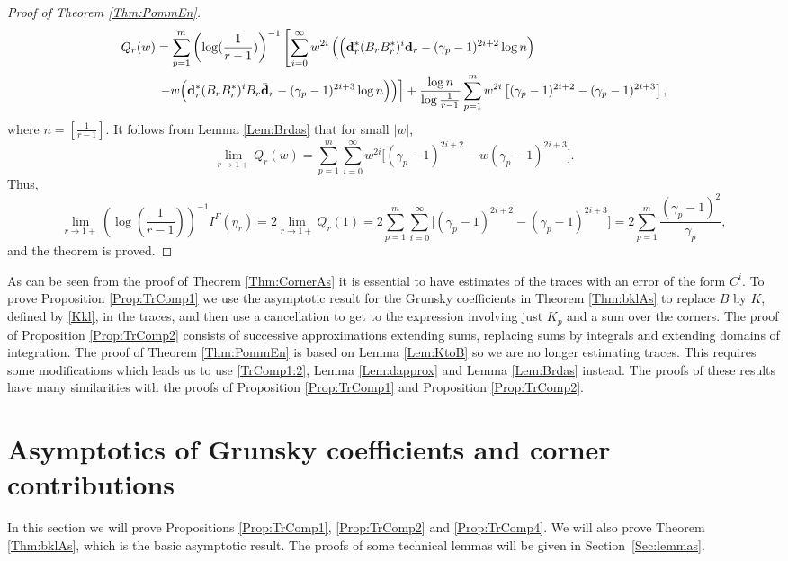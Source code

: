 \documentclass{article}
\numberwithin{equation}{section}
\numberwithin{figure}{section}
\theoremstyle{plain}
\theoremstyle{plain}
\numberwithin{thm}{section}
\theoremstyle{remark}
\begin{document}
\begin{proof}[Proof of Theorem \ref{Thm:PommEn}]
\begin{align*}
    Q_r(w)&=\sum_{p=1}^m\left(\log(\frac 1{r-1})\right)^{-1}\left[\sum_{i=0}^\infty w^{2i}\left(\Big({\bf d}_r^*(B_rB_r^*)^i{\bf d}_r-(\gamma_p-1)^{2i+2}\log n\Big)\right.\right.\\
    &\left.\left.-w\Big({\bf d}_r^*(B_rB_r^*)^iB_r\bar{{\bf d}}_r-(\gamma_p-1)^{2i+3}\log n\Big)\right)\right]
+\frac{\log n}{\log\frac 1{r-1}}\sum_{p=1}^m w^{2i}\left[(\gamma_p-1)^{2i+2}-(\gamma_p-1)^{2i+3}\right],
\end{align*}
where $n=[\frac 1{r-1}]$. It follows from Lemma \ref{Lem:Brdas} that for small $|w|$,
\begin{equation}
    \lim_{r\to 1+}Q_r(w)=\sum_{p=1}^m\sum_{i=0}^\infty w^{2i}\Big[(\gamma_p-1)^{2i+2}-w(\gamma_p-1)^{2i+3}\Big].
\end{equation}
Thus,
\begin{equation*}
    \lim_{r\to 1+}\left(\log(\frac 1{r-1})\right)^{-1}I^F(\eta_r)=2 \lim_{r\to 1+}Q_r(1)=2\sum_{p=1}^m\sum_{i=0}^\infty\Big[(\gamma_p-1)^{2i+2}-(\gamma_p-1)^{2i+3}\Big]=2 \sum_{p=1}^m\frac{(\gamma_p-1)^2}{\gamma_p},
\end{equation*}
and the theorem is proved.
\end{proof}

As can be seen from the proof of Theorem \ref{Thm:CornerAs} it is essential to have estimates of the traces with an error of the form $C^i$. To prove Proposition \ref{Prop:TrComp1} we use the asymptotic result for the Grunsky coefficients in Theorem \ref{Thm:bklAs} to replace $B$ by $K$, defined by \eqref{Kkl}, in the traces, and then use a cancellation to get to the expression involving just $K_p$ and a sum over the corners. The proof of Proposition \ref{Prop:TrComp2} consists of successive approximations extending sums, replacing sums by integrals and extending domains of integration. The proof of Theorem \ref{Thm:PommEn} is based on Lemma \ref{Lem:KtoB} so we are no longer estimating traces. This requires some modifications which leads us to use \eqref{TrComp1:2}, Lemma \ref{Lem:dapprox} and Lemma \ref{Lem:Brdas} instead. The proofs of these results have many similarities with the proofs of Proposition \ref{Prop:TrComp1} and Proposition \ref{Prop:TrComp2}.


\section{Asymptotics of Grunsky coefficients and corner contributions}\label{sec:proofsbasic}
In this section we will prove Propositions \ref{Prop:TrComp1}, \ref{Prop:TrComp2} and \ref{Prop:TrComp4}. We will also prove Theorem
\ref{Thm:bklAs}, which is the basic asymptotic result. The proofs of some technical lemmas will be given in Section~\ref{Sec:lemmas}.
\end{document}

